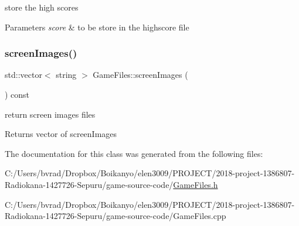 store the high scores 


\begin{DoxyParams}{Parameters}
{\em score} & to be store in the highscore file \\
\hline
\end{DoxyParams}
\mbox{\label{class_game_files_a62b2640ebb37c6c5e68ca7c369955b90}} 
\subsubsection{\texorpdfstring{screen\+Images()}{screenImages()}}
{\footnotesize\ttfamily std\+::vector$<$ string $>$ Game\+Files\+::screen\+Images (\begin{DoxyParamCaption}{ }\end{DoxyParamCaption}) const}



return screen images files 

\begin{DoxyReturn}{Returns}
vector of screen\+Images 
\end{DoxyReturn}


The documentation for this class was generated from the following files\+:\begin{DoxyCompactItemize}
\item 
C\+:/\+Users/bvrad/\+Dropbox/\+Boikanyo/elen3009/\+P\+R\+O\+J\+E\+C\+T/2018-\/project-\/1386807-\/\+Radiokana-\/1427726-\/\+Sepuru/game-\/source-\/code/\mbox{\hyperlink{_game_files_8h}{Game\+Files.\+h}}\item 
C\+:/\+Users/bvrad/\+Dropbox/\+Boikanyo/elen3009/\+P\+R\+O\+J\+E\+C\+T/2018-\/project-\/1386807-\/\+Radiokana-\/1427726-\/\+Sepuru/game-\/source-\/code/Game\+Files.\+cpp\end{DoxyCompactItemize}

